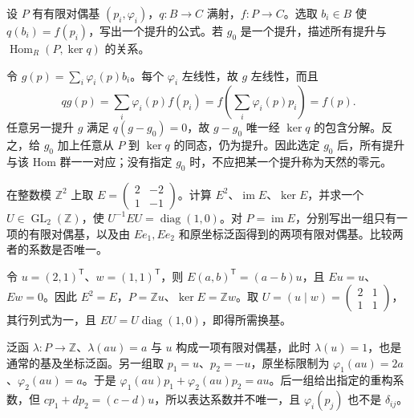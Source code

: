 \begin{exercise}\label{b2:ex:07-explicit-lifting}
	设 \(P\) 有有限对偶基 \((p_i,\varphi_i)\)，\(q:B\to C\) 满射，\(f:P\to C\)。选取 \(b_i\in B\) 使 \(q(b_i)=f(p_i)\)，写出一个提升的公式。若 \(g_0\) 是一个提升，描述所有提升与 \(\operatorname{Hom}_R(P,\ker q)\) 的关系。
\end{exercise}
\begin{solution}
	令 \(g(p)=\sum_i\varphi_i(p)b_i\)。每个 \(\varphi_i\) 左线性，故 \(g\) 左线性，而且
	\[
		qg(p)=\sum_i\varphi_i(p)f(p_i) =f\left(\sum_i\varphi_i(p)p_i\right)=f(p).
	\]
	任意另一提升 \(g\) 满足 \(q(g-g_0)=0\)，故 \(g-g_0\) 唯一经 \(\ker q\) 的包含分解。反之，给 \(g_0\) 加上任意从 \(P\) 到 \(\ker q\) 的同态，仍为提升。因此选定 \(g_0\) 后，所有提升与该 Hom 群一一对应；没有指定 \(g_0\) 时，不应把某一个提升称为天然的零元。
\end{solution}

\begin{exercise}\label{b2:ex:07-idempotent-matrix}
	在整数模 \(\mathbb Z^2\) 上取 \(E=\begin{pmatrix}2&-2\\1&-1\end{pmatrix}\)。计算 \(E^2\)、\(\operatorname{im}E\)、\(\ker E\)，并求一个 \(U\in\operatorname{GL}_2(\mathbb Z)\)，使 \(U^{-1}EU=\operatorname{diag}(1,0)\)。对 \(P=\operatorname{im}E\)，分别写出一组只有一项的有限对偶基，以及由 \(Ee_1,Ee_2\) 和原坐标泛函得到的两项有限对偶基。比较两者的系数是否唯一。
\end{exercise}
\begin{solution}
	令 \(u=(2,1)^{\mathsf T}\)、\(w=(1,1)^{\mathsf T}\)，则 \(E(a,b)^{\mathsf T}=(a-b)u\)，且 \(Eu=u\)、\(Ew=0\)。因此 \(E^2=E\)，\(P=\mathbb Zu\)、\(\ker E=\mathbb Zw\)。取 \(U=(u\mid w)=\begin{pmatrix}2&1\\1&1\end{pmatrix}\)，其行列式为一，且 \(EU=U\operatorname{diag}(1,0)\)，即得所需换基。

	泛函 \(\lambda:P\to\mathbb Z\)、\(\lambda(au)=a\) 与 \(u\) 构成一项有限对偶基，此时 \(\lambda(u)=1\)，也是通常的基及坐标泛函。另一组取 \(p_1=u\)、\(p_2=-u\)，原坐标限制为 \(\varphi_1(au)=2a\)、\(\varphi_2(au)=a\)。于是 \(\varphi_1(au)p_1+\varphi_2(au)p_2=au\)。后一组给出指定的重构系数，但 \(cp_1+dp_2=(c-d)u\)，所以表达系数并不唯一，且 \(\varphi_i(p_j)\) 也不是 \(\delta_{ij}\)。
\end{solution}

